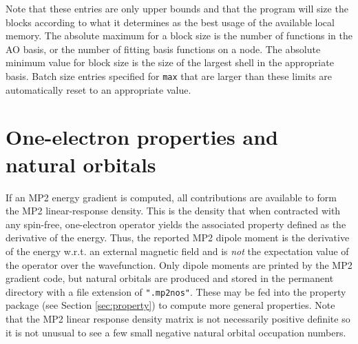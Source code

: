 Note that these entries are only upper bounds and that the program
will size the blocks according to what it determines as the best usage of
the available local memory.  The absolute maximum for a block size is
the number of functions in the AO basis, or the number of fitting basis
functions on a node.  The absolute minimum value for block size is the 
size of the largest shell in the appropriate basis.  Batch size entries 
specified for \verb+max+  that are larger than these limits are 
automatically reset to an appropriate value.


\section{One-electron properties and natural orbitals}

If an MP2 energy gradient is computed, all contributions are available
to form the MP2 linear-response density.  This is the density that
when contracted with any spin-free, one-electron operator yields the
associated property defined as the derivative of the energy.  Thus,
the reported MP2 dipole moment is the derivative of the energy
w.r.t. an external magnetic field and is {\em not} the expectation
value of the operator over the wavefunction.  Only dipole moments are
printed by the MP2 gradient code, but natural orbitals are produced
and stored in the permanent directory with a file extension of
\verb+".mp2nos"+.  These may be fed into the property package (see
Section \ref{sec:property}) to compute more general properties.  Note
that the MP2 linear response density matrix is not necessarily
positive definite so it is not unusual to see a few small negative
natural orbital occupation numbers.


